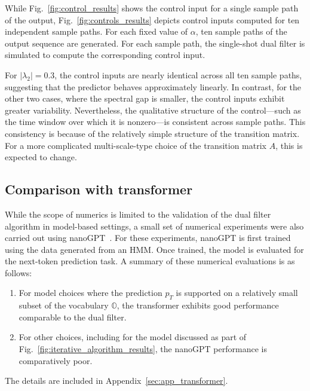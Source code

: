 \documentclass[twoside,11pt]{article}
\def\Fig#1{Fig.~\ref{#1}}
\def\Fig#1{Fig.~\ref{#1}}
\def\bO{\mathbb{O}}
\begin{document}
While \Fig{fig:control_results} shows the control input for a single sample path of the output, \Fig{fig:controls_results} depicts control inputs computed for ten independent sample paths. 
For each fixed value of $\alpha$, ten sample paths of the output sequence are generated. 
For each sample path, the single-shot dual filter is simulated to compute the corresponding control input.

For $|\lambda_2|=0.3$, the control inputs are nearly identical across all ten sample paths, suggesting that the predictor behaves approximately linearly.
In contrast, for the other two cases, where the spectral gap is smaller, the control inputs exhibit greater variability.  
Nevertheless, the qualitative structure of the control---such as the time window over which it is nonzero---is consistent across sample paths. This consistency is because of the relatively simple structure of the transition matrix.  
For a more complicated multi-scale-type choice of the transition matrix $A$, this is expected to change.   

\subsection{Comparison with transformer}
\label{sec:comparison_transformer}

While the scope of numerics is limited to the
validation of the dual filter algorithm in model-based settings, a
small set of numerical experiments were also carried out using
nanoGPT~\citep{karpathy2024nanogpt}.
For these experiments, nanoGPT is first trained using the data generated
from an HMM.  Once trained, the model is evaluated for the next-token
prediction task.  A summary of these numerical evaluations is as
follows: 
\begin{enumerate}
\item For model choices where the prediction $p_T$ is supported on a
  relatively small subset of the vocabulary $\bO$, the transformer
  exhibits good performance comparable to the dual filter.
\item For other choices, including for the model discussed as part of
  \Fig{fig:iterative_algorithm_results}, the nanoGPT performance is
  comparatively poor.
\end{enumerate}
The details are included in Appendix~\ref{sec:app_transformer}.  
\end{document}
